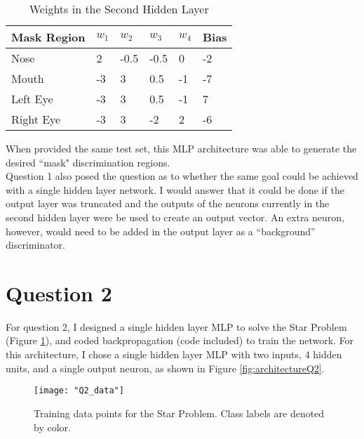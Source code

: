 \documentclass{article}[12 pt]
\begin{document}
\begin{table}[H]
	\caption{Weights in the Second Hidden Layer}
	\label{tab:WeightsSecondHiddenLayer}
	\begin{center}
		\begin{tabularx}{\textwidth}{ |X|X|X|X|X|X| } 
			\hline
			\textbf{Mask Region} & \textbf{$w_1$} & \textbf{$w_2$} & \textbf{$w_3$} & \textbf{$w_4$} & \textbf{Bias}\\
			\hline
			Nose & 2 &  -0.5 & -0.5 & 0 & -2\\
			\hline
			Mouth & -3 & 3 & 0.5 & -1 & -7\\
			\hline
			Left Eye & -3 & 3 & 0.5 & -1 & 7\\
			\hline
			Right Eye & -3 & 3 & -2 & 2 & -6\\
			\hline
		\end{tabularx}
	\end{center}
\end{table}

\noindent
When provided the same test set, this MLP architecture was able to generate the desired ``mask" discrimination regions.\\

\noindent
Question 1 also posed the question as to whether the same goal could be achieved with a single hidden layer network.  I would answer that it could be done if the output layer was truncated and the outputs of the neurons currently in the second hidden layer were be used to create an output vector.  An extra neuron, however, would need to be added in the output layer as a ``background'' discriminator. 


\section*{Question 2}

For question 2, I designed a single hidden layer MLP to solve the Star Problem (Figure \ref{fig:Q2Data}), and coded backpropagation (code included) to train the network.  For this architecture, I chose a single hidden layer MLP with two inputs, 4 hidden units, and a single output neuron, as shown in Figure \ref{fig:architectureQ2}.  

\begin{center}
	\begin{figure}[H]
		\centering
		\texttt{[image: "Q2\_data"]}
		\caption{Training data points for the Star Problem.  Class labels are denoted by color. }
		\label{fig:Q2Data}
	\end{figure}
\end{center}
\end{document}
